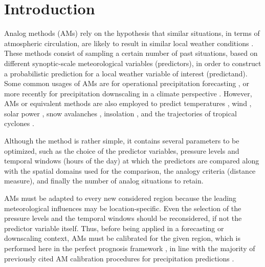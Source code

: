 \documentclass{ametsoc}
\begin{document}


\section{Introduction}
\label{sec:intro}

Analog methods (AMs) rely on the hypothesis that similar situations, in terms of atmospheric circulation, are likely to result in similar local weather conditions \citep{Lorenz1956, Lorenz1969, Duband1970, Bontron2005}. These methods consist of sampling a certain number of past situations, based on different synoptic-scale meteorological variables (predictors), in order to construct a probabilistic prediction for a local weather variable of interest (predictand). Some common usages of AMs are for operational precipitation forecasting \citep[e.g.,][]{Guilbaud1997, Bontron2005, Hamill2006, Bliefernicht2010, Marty2012, Horton2012, Hamill2015b, BenDaoud2016}, or more recently for precipitation downscaling in a climate perspective \citep[e.g.,][]{Radanovics2013, Chardon2014, Dayon2015}. However, AMs or equivalent methods are also employed to predict temperatures \citep{Radinovic1975, Woodcock1980, Kruizinga1983, DelleMonache2013, Caillouet2016}, wind \citep{Gordon1987, DelleMonache2013, DelleMonache2011, Vanvyve2015, Alessandrini2015, Junk2015, Junk2015c}, solar power \citep{Alessandrini2015a, Bessa2015}, snow avalanches \citep{Obled1980, Bolognesi1993}, insolation \citep{Bois1981}, and the trajectories of tropical cyclones \citep{Keenan1981, Sievers2000, Fraedrich2003}.

Although the method is rather simple, it contains several parameters to be optimized, such as the choice of the predictor variables, pressure levels and temporal windows (hours of the day) at which the predictors are compared along with the spatial domains used for the comparison, the analogy criteria (distance measure), and finally the number of analog situations to retain. 

AMs must be adapted to every new considered region because the leading meteorological influences may be location-specific. Even the selection of the pressure levels and the temporal windows should be reconsidered, if not the predictor variable itself. Thus, before being applied in a forecasting or downscaling context, AMs must be calibrated for the given region, which is performed here in the perfect prognosis framework \citep{Klein1963}, in line with the majority of previously cited AM calibration procedures for precipitation predictions \cite[with the exception of][]{Hamill2006,Hamill2015b}.
\end{document}
